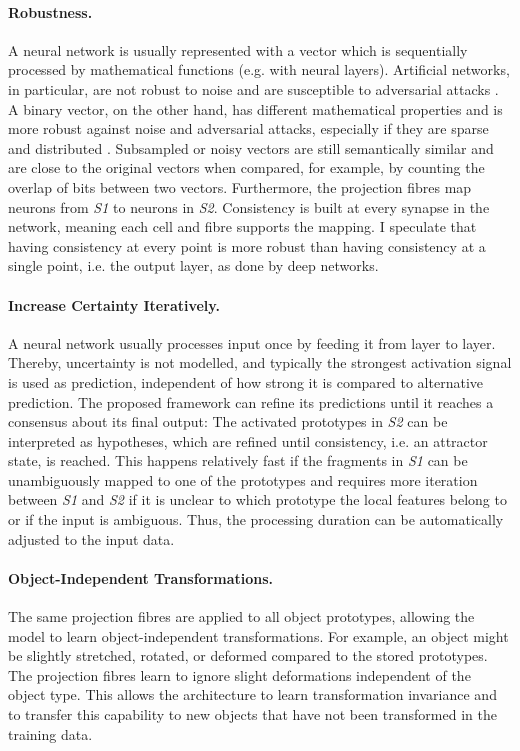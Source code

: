 \paragraph{Robustness.} A neural network is usually represented with a vector which is sequentially processed by mathematical functions (e.g. with neural layers). Artificial networks, in particular, are not robust to noise and are susceptible to adversarial attacks . A binary vector, on the other hand, has different mathematical properties and is more robust against noise and adversarial attacks, especially if they are sparse and distributed .
Subsampled or noisy vectors are still semantically similar and are close to the original vectors when compared, for example, by counting the overlap of bits between two vectors.
Furthermore, the projection fibres map neurons from \emph{S1} to neurons in \emph{S2}. Consistency is built at every synapse in the network, meaning each cell and fibre supports the mapping. I speculate that having consistency at every point is more robust than having consistency at a single point, i.e. the output layer, as done by deep networks.

\paragraph{Increase Certainty Iteratively.} A neural network usually processes input once by feeding it from layer to layer. Thereby, uncertainty is not modelled, and typically the strongest activation signal is used as prediction, independent of how strong it is compared to alternative prediction.
The proposed framework can refine its predictions until it reaches a consensus about its final output: The activated prototypes in \emph{S2} can be interpreted as hypotheses, which are refined until consistency, i.e. an attractor state, is reached. This happens relatively fast if the fragments in \emph{S1} can be unambiguously mapped to one of the prototypes and requires more iteration between \emph{S1} and \emph{S2} if it is unclear to which prototype the local features belong to or if the input is ambiguous. Thus, the processing duration can be automatically adjusted to the input data.

\paragraph{Object-Independent Transformations.} The same projection fibres are applied to all object prototypes, allowing the model to learn object-independent transformations. For example, an object might be slightly stretched, rotated, or deformed compared to the stored prototypes. The projection fibres learn to ignore slight deformations independent of the object type. This allows the architecture to learn transformation invariance and to transfer this capability to new objects that have not been transformed in the training data.


